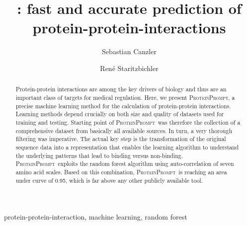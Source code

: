 \documentclass[3p,times,twocolumn]{elsarticle}
\title{\tool: fast and accurate prediction of protein-protein-interactions}
\newcommand{\tool}{\textsc{ProteinPrompt}}
\begin{document}
  
\author[LEI,UFZ,IMT]{Sebastian Canzler}
\author[PHY,IMT]{Ren\'{e} Staritzbichler}

\address[LEI]{Bioinformatics Group, Department of Computer Science,
  University of Leipzig,
  H{\"a}rtelstra{\ss}e 16-18, 04107 Leipzig, Germany
}

\address[PHY]{ProteinFormatics Group, Institute of Medical Physics and Biophysics, University of Leipzig,
  H{\"a}rtelstra{\ss}e 16-18, 04107 Leipzig, Germany.}

\address[UFZ]{Young Investigators Group Bioinformatics and Transcriptomics, Department of Proteomics, Helmholtz Centre for Environmental Research – UFZ, 04318 Leipzig, Germany}

\address[IMT]{Immuthera GmbH, L{\"o}{\ss}niger Stra{\ss}e 16, 04275 Leipzig, Germany.}


 

\begin{abstract}

  Protein-protein interactions are among the key drivers of biology and thus are an important class of targets for medical regulation.
  Here, we present \tool, a precise machine learning method for the calculation of protein-protein interactions.
  Learning methods depend crucially on both size and quality of datasets used for training and testing.
  Starting point of \tool\  was therefore the collection of a comprehensive dataset from basically all available sources.
  In turn, a very thorough filtering was imperative.
  The actual key step is the transformation of the original sequence data into a representation that enables the learning algorithm to understand the underlying patterns that lead to binding versus non-binding.
   \tool\  exploits the random forest algorithm using auto-correlation of seven amino acid scales.
   Based on this combination, \tool\  is reaching an area under curve of 0.95, which is far above any other publicly available tool. 
    

\end{abstract}

\begin{keyword}
  protein-protein-interaction, machine learning, random forest
\end{keyword}
\end{document}
